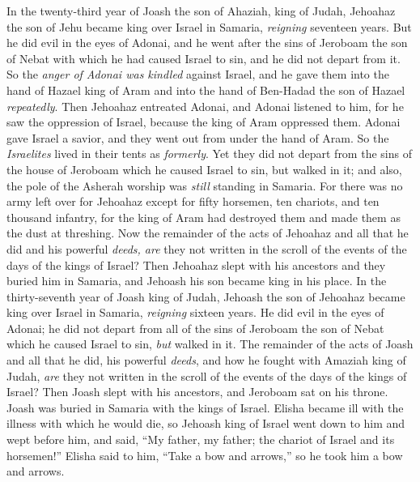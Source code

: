 \begin{biblechapter} %
 In the twenty-third year of Joash the son of Ahaziah, king of Judah, Jehoahaz the son of Jehu became king over Israel in Samaria, \textit{reigning} seventeen years.
\verse But he did evil in the eyes of Adonai, and he went after the sins of Jeroboam the son of Nebat with which he had caused Israel to sin, and he did not depart from it.
\verse So the \textit{anger of Adonai was kindled} against Israel, and he gave them into the hand of Hazael king of Aram and into the hand of Ben-Hadad the son of Hazael \textit{repeatedly}.
\verse Then Jehoahaz entreated Adonai, and Adonai listened to him, for he saw the oppression of Israel, because the king of Aram oppressed them.
\verse Adonai gave Israel a savior, and they went out from under the hand of Aram. So the \textit{Israelites} lived in their tents as \textit{formerly}.
\verse Yet they did not depart from the sins of the house of Jeroboam which he caused Israel to sin, but walked in it; and also, the pole of the Asherah worship was \textit{still} standing in Samaria.
\verse For there was no army left over for Jehoahaz except for fifty horsemen, ten chariots, and ten thousand infantry, for the king of Aram had destroyed them and made them as the dust at threshing.
\verse Now the remainder of the acts of Jehoahaz and all that he did and his powerful \textit{deeds, are} they not written in the scroll of the events of the days of the kings of Israel?
\verse Then Jehoahaz slept with his ancestors and they buried him in Samaria, and Jehoash his son became king in his place.
\verse In the thirty-seventh year of Joash king of Judah, Jehoash the son of Jehoahaz became king over Israel in Samaria, \textit{reigning} sixteen years.
\verse He did evil in the eyes of Adonai; he did not depart from all of the sins of Jeroboam the son of Nebat which he caused Israel to sin, \textit{but} walked in it.
\verse The remainder of the acts of Joash and all that he did, his powerful \textit{deeds}, and how he fought with Amaziah king of Judah, \textit{are} they not written in the scroll of the events of the days of the kings of Israel?
\verse Then Joash slept with his ancestors, and Jeroboam sat on his throne. Joash was buried in Samaria with the kings of Israel.
 Elisha became ill with the illness with which he would die, so Jehoash king of Israel went down to him and wept before him, and said, “My father, my father; the chariot of Israel and its horsemen!”
\verse Elisha said to him, “Take a bow and arrows,” so he took him a bow and arrows.

\end{biblechapter}
